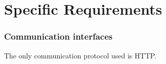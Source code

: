 \chapter{Specific Requirements}










\subsection{Communication interfaces}
The only communication protocol used is HTTP.


